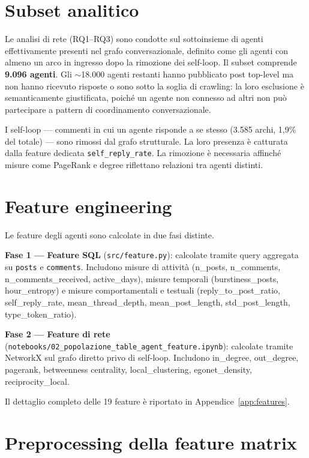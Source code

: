 \documentclass[12pt,a4paper]{report}
\newcommand{\code}[1]{\texttt{#1}}
\begin{document}
\section{Subset analitico}

Le analisi di rete (RQ1--RQ3) sono condotte sul sottoinsieme di agenti effettivamente presenti nel grafo conversazionale, definito come gli agenti con almeno un arco in ingresso dopo la rimozione dei self-loop. Il subset comprende \textbf{9.096 agenti}. Gli $\sim$18.000 agenti restanti hanno pubblicato post top-level ma non hanno ricevuto risposte o sono sotto la soglia di crawling: la loro esclusione è semanticamente giustificata, poiché un agente non connesso ad altri non può partecipare a pattern di coordinamento conversazionale.

I self-loop — commenti in cui un agente risponde a se stesso (3.585 archi, 1,9\% del totale) — sono rimossi dal grafo strutturale. La loro presenza è catturata dalla feature dedicata \code{self\_reply\_rate}. La rimozione è necessaria affinché misure come PageRank e degree riflettano relazioni tra agenti distinti.

\section{Feature engineering}

Le feature degli agenti sono calcolate in due fasi distinte.

\textbf{Fase 1 — Feature SQL} (\code{src/feature.py}): calcolate tramite query aggregata su \code{posts} e \code{comments}. Includono misure di attività (n\_posts, n\_comments, n\_comments\_received, active\_days), misure temporali (burstiness\_posts, hour\_entropy) e misure comportamentali e testuali (reply\_to\_post\_ratio, self\_reply\_rate, mean\_thread\_depth, mean\_post\_length, std\_post\_length, type\_token\_ratio).

\textbf{Fase 2 — Feature di rete} (\code{notebooks/02\_popolazione\_table\_agent\_feature.ipynb}): calcolate tramite NetworkX sul grafo diretto privo di self-loop. Includono in\_degree, out\_degree, pagerank, betweenness centrality, local\_clustering, egonet\_density, reciprocity\_local.

Il dettaglio completo delle 19 feature è riportato in Appendice~\ref{app:features}.

\section{Preprocessing della feature matrix}
\end{document}
